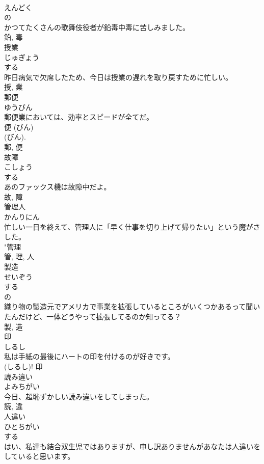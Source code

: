 \documentclass[8pt]{extreport}
\begin{document}
\begin{CJK}{UTF8}{min}
\\	えんどく	
\\	の 
\\	かつてたくさんの歌舞伎役者が鉛毒中毒に苦しみました。	
\\	鉛, 毒	
\\	授業	
\\	じゅぎょう	
\\	する 
\\	昨日病気で欠席したため、今日は授業の遅れを取り戻すために忙しい。	
\\	授, 業	
\\	郵便	
\\	ゆうびん	
\\	郵便業においては、効率とスピードが全てだ。	
\\	便 (びん) 
\\	(びん). 
\\	郵, 便	
\\	故障	
\\	こしょう	
\\	する 
\\	あのファックス機は故障中だよ。	
\\	故, 障	
\\	管理人	
\\	かんりにん	
\\	忙しい一日を終えて、管理人に「早く仕事を切り上げて帰りたい」という魔がさした。	
\\	"管理 
\\	管, 理, 人	
\\	製造	
\\	せいぞう	
\\	する 
\\	の 
\\	織り物の製造元でアメリカで事業を拡張しているところがいくつかあるって聞いたんだけど、一体どうやって拡張してるのか知ってる？	
\\	製, 造	
\\	印	
\\	しるし	
\\	私は手紙の最後にハートの印を付けるのが好きです。	
\\	(しるし)!	印	
\\	読み違い	
\\	よみちがい	
\\	今日、超恥ずかしい読み違いをしてしまった。	
\\	読, 違	
\\	人違い	
\\	ひとちがい	
\\	する 
\\	はい、私達も結合双生児ではありますが、申し訳ありませんがあなたは人違いをしていると思います。	

\end{CJK}
\end{document}
